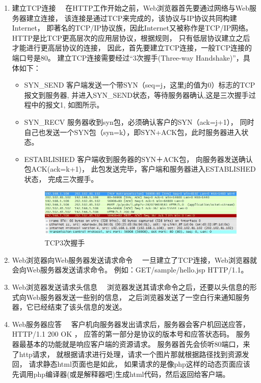 \documentclass{book}
\begin{document}
\begin{enumerate}
\setcounter{enumi}{0}
\item{建立TCP连接}~~
在HTTP工作开始之前，Web浏览器首先要通过网络与Web服务器建立连接，
该连接是通过TCP来完成的，该协议与IP协议共同构建Internet，
即著名的TCP/IP协议族，因此Internet又被称作是TCP/IP网络。
HTTP是比TCP更高层次的应用层协议，根据规则，
只有低层协议建立之后才能进行更高层协议的连接，
因此，首先要建立TCP连接，一般TCP连接的端口号是80。
建立TCP连接需要经过“3次握手(Three-way Handshake)”，具体如下：

\begin{itemize}
\item{SYN\_SEND}
客户端发送一个带SYN（seq=j，这里j的值为0）标志的TCP报文到服务器,
并进入SYN\_SEND状态，等待服务器确认,这是三次握手过程中的报文1,
如图所示。

\item{SYN\_RECV}
服务器收到syn包，必须确认客户的SYN（ack=j+1），
同时自己也发送一个SYN包（syn=k），即SYN+ACK包，此时服务器进入状态。

\item{ESTABLISHED}
客户端收到服务器的SYN＋ACK包，
向服务器发送确认包ACK(ack=k+1)，
此包发送完毕，客户端和服务器进入ESTABLISHED状态，
完成三次握手。

\begin{figure}[htbp]
	\centering
	\includegraphics[scale=0.7]{TCPThreeHanding.jpg}
	\caption{TCP3次握手}
	\label{fig:TCPThreeHanding}
\end{figure}

\end{itemize}

\item{Web浏览器向Web服务器发送请求命令}~~
一旦建立了TCP连接，Web浏览器就会向Web服务器发送请求命令。
例如：GET/sample/hello.jsp HTTP/1.1。

\item{Web浏览器发送请求头信息}~~
浏览器发送其请求命令之后，还要以头信息的形式向Web服务器发送一些别的信息，
之后浏览器发送了一空白行来通知服务器，它已经结束了该头信息的发送。

\item{Web服务器应答}~~
客户机向服务器发出请求后，服务器会客户机回送应答， HTTP/1.1 200 OK ，
应答的第一部分是协议的版本号和应答状态码。
服务器最基本的功能就是响应客户端的资源请求。
服务器首先会侦听80端口，来了http请求，
就根据请求进行处理，请求一个图片那就根据路径找到资源发回，
请求静态html页面也是如此，
如果请求的是像php这样的动态页面应该先调用php编译器(或是解释器吧)生成html代码，然后返回给客户端。


\end{enumerate}
\end{document}
